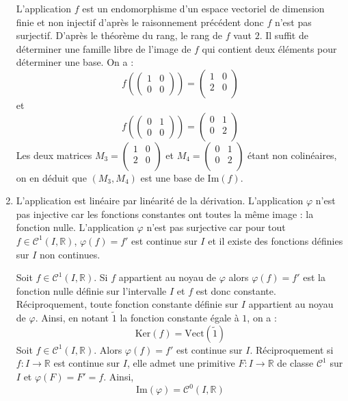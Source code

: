\documentclass[a4paper,twoside,french,11pt]{VcCours}
\begin{document}
\begin{enumerate}
\noindent L'application $f$ est un endomorphisme d'un espace vectoriel de dimension finie et non injectif d'après le raisonnement précédent donc $f$ n'est pas surjectif. D'après le théorème du rang, le rang de $f$ vaut $2$. Il suffit de déterminer une famille libre de l'image de $f$ qui contient deux éléments pour déterminer une base. On a :
$$  f \left( \begin{pmatrix}
1 & 0 \\
0 & 0
\end{pmatrix} \right) = \begin{pmatrix}
1 & 0 \\
2 & 0 \\
\end{pmatrix}$$
et 
$$  f \left( \begin{pmatrix}
0 & 1 \\
0 & 0
\end{pmatrix} \right) = \begin{pmatrix}
0 & 1 \\
0 & 2 \\
\end{pmatrix}$$
Les deux matrices $M_3=\begin{pmatrix}
1 & 0 \\
2 & 0 \\
\end{pmatrix}$ et $M_4=\begin{pmatrix}
0 & 1 \\
0 & 2 \\
\end{pmatrix}$ étant non colinéaires, on en déduit que $(M_3,M_4)$ est une base de $\textrm{Im}(f)$.
\item L'application est linéaire par linéarité de la dérivation. L'application $\varphi$ n'est pas injective car les fonctions constantes ont toutes la même image : la fonction nulle. L'application $\varphi$ n'est pas surjective car pour tout $f \in \mathcal{C}^1(I, \mathbb{R})$, $\varphi(f)=f'$ est continue sur $I$ et il existe des fonctions définies sur $I$ non continues.


\noindent Soit $f \in \mathcal{C}^1(I, \mathbb{R})$. Si $f$ appartient au noyau de $\varphi$ alors $\varphi(f)=f'$ est la fonction nulle définie sur l'intervalle $I$ et $f$ est donc constante. Réciproquement, toute fonction constante définie sur $I$ appartient au noyau de $\varphi$. Ainsi, en notant $\tilde{1}$ la fonction constante égale à $1$, on a :
$$ \textrm{Ker}(f) = \textrm{Vect}( \tilde{1} )$$
Soit $f \in \mathcal{C}^1(I, \mathbb{R})$. Alors $\varphi(f) = f'$ est continue sur $I$. Réciproquement si $f : I \rightarrow \mathbb{R}$ est continue sur $I$, elle admet une primitive $F : I \rightarrow \mathbb{R}$ de classe $\mathcal{C}^1$ sur $I$ et $\varphi(F)=F'=f$. Ainsi, 
$$  \textrm{Im}(\varphi) = \mathcal{C}^0(I, \mathbb{R})$$
\end{enumerate}
\end{document}

